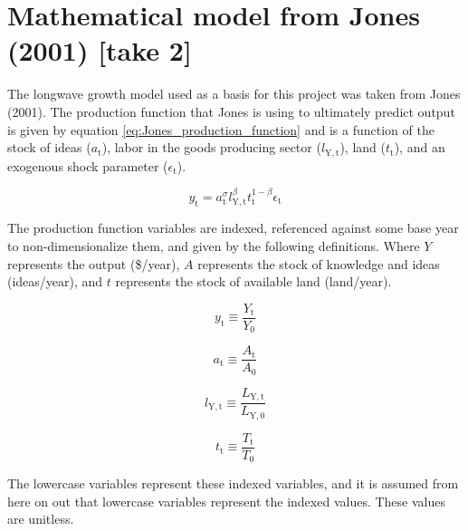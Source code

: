 \documentclass[letterpaper,12pt]{article}
\begin{document}

\section{Mathematical model from Jones (2001) [take 2]}
The longwave growth model used as a basis for this project was taken from Jones (2001). The production function that Jones is using to ultimately predict output is given by equation \ref{eq:Jones_production_function} and is a function of the stock of ideas ($a_\mathrm{t}$), labor in the goods producing sector ($l_\mathrm{Y,t}$), land ($t_\mathrm{t}$), and an exogenous shock parameter ($\epsilon_\mathrm{t}$).

\begin{equation} \label{eq:Jones_production_function}
	y_\mathrm{t} = a_\mathrm{t} ^\sigma l_\mathrm{Y,t} ^\beta t_\mathrm{t} ^{1-\beta} \epsilon_\mathrm{t}
\end{equation}

The production function variables are indexed, referenced against some base year to non-dimensionalize them, and given by the following definitions. Where $Y$ represents the output (\$/year), $A$ represents the stock of knowledge and ideas (ideas/year), and $t$ represents the stock of available land (land/year).

\begin{equation} \label{eq:index_y}
	y_\mathrm{t} \equiv \frac{Y_\mathrm{t}}{Y_\mathrm{0}}
\end{equation}

\begin{equation} \label{eq:index_a}
	a_\mathrm{t} \equiv \frac{A_\mathrm{t}}{A_\mathrm{0}}
\end{equation}

\begin{equation} \label{eq:index_l}
	l_\mathrm{Y,t} \equiv \frac{L_\mathrm{Y,t}}{L_\mathrm{Y,0}}
\end{equation}

\begin{equation} \label{eq:index_t}
	t_\mathrm{t} \equiv \frac{T_\mathrm{t}}{T_\mathrm{0}}
\end{equation}

The lowercase variables represent these indexed variables, and it is assumed from here on out that lowercase variables represent the indexed values. These values are unitless.
\end{document}
